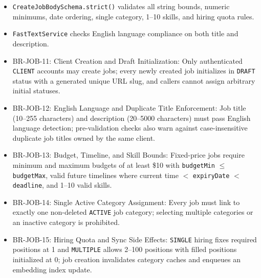 \begin{itemize}[leftmargin=1.6em,topsep=3pt,itemsep=2pt,parsep=0pt,label=$\bullet$]
    \item \texttt{CreateJobBodySchema.strict()} validates all string bounds, numeric minimums, date ordering, single category, 1--10 skills, and hiring quota rules.
    \item \texttt{FastTextService} checks English language compliance on both title and description.
\end{itemize}

\begin{itemize}[leftmargin=1.6em,topsep=3pt,itemsep=2pt,parsep=0pt,label=$\bullet$]\brrulelist
    \item BR-JOB-11: Client Creation and Draft Initialization: Only authenticated \texttt{CLIENT} accounts may create jobs; every newly created job initializes in \texttt{DRAFT} status with a generated unique URL slug, and callers cannot assign arbitrary initial statuses.
    \item BR-JOB-12: English Language and Duplicate Title Enforcement: Job title (10--255 characters) and description (20--5000 characters) must pass English language detection; pre-validation checks also warn against case-insensitive duplicate job titles owned by the same client.
    \item BR-JOB-13: Budget, Timeline, and Skill Bounds: Fixed-price jobs require minimum and maximum budgets of at least \$10 with \texttt{budgetMin} $\le$ \texttt{budgetMax}, valid future timelines where current time $<$ \texttt{expiryDate} $<$ \texttt{deadline}, and 1--10 valid skills.
    \item BR-JOB-14: Single Active Category Assignment: Every job must link to exactly one non-deleted \texttt{ACTIVE} job category; selecting multiple categories or an inactive category is prohibited.
    \item BR-JOB-15: Hiring Quota and Sync Side Effects: \texttt{SINGLE} hiring fixes required positions at 1 and \texttt{MULTIPLE} allows 2--100 positions with filled positions initialized at 0; job creation invalidates category caches and enqueues an embedding index update.
\end{itemize}

